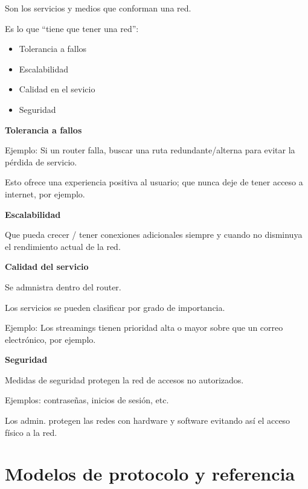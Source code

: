 \documentclass{article}
\begin{document}
Son los servicios y medios que conforman una red.
\vspace{1em}

Es lo que ``tiene que tener una red'':
\begin{itemize}
	\item
	Tolerancia a fallos
	\item
	Escalabilidad
	\item
	Calidad en el sevicio
	\item
	Seguridad
\end{itemize}
\vspace{1em}

\textbf{Tolerancia a fallos}
\vspace{1em}

Ejemplo: Si un router falla, buscar una ruta redundante/alterna
para evitar la pérdida de servicio.
\vspace{1em}

Esto ofrece una experiencia positiva al usuario; que nunca deje de tener
acceso a internet, por ejemplo.
\vspace{1em}

\textbf{Escalabilidad}

Que pueda crecer / tener conexiones adicionales siempre y cuando no disminuya
el rendimiento actual de la red.
\vspace{1em}

\textbf{Calidad del servicio}

Se admnistra dentro del router.
\vspace{1em}

Los servicios se pueden clasificar por grado de importancia.
\vspace{1em}

Ejemplo: Los streamings tienen prioridad alta o mayor sobre que un correo
electrónico, por ejemplo.
\vspace{1em}

\textbf{Seguridad}

Medidas de seguridad protegen la red de accesos no autorizados.

Ejemplos: contraseñas, inicios de sesión, etc.

Los admin. protegen las redes con hardware y software evitando así el acceso
físico a la red.
\vspace{1em}


\section{Modelos de protocolo y referencia}
\end{document}
